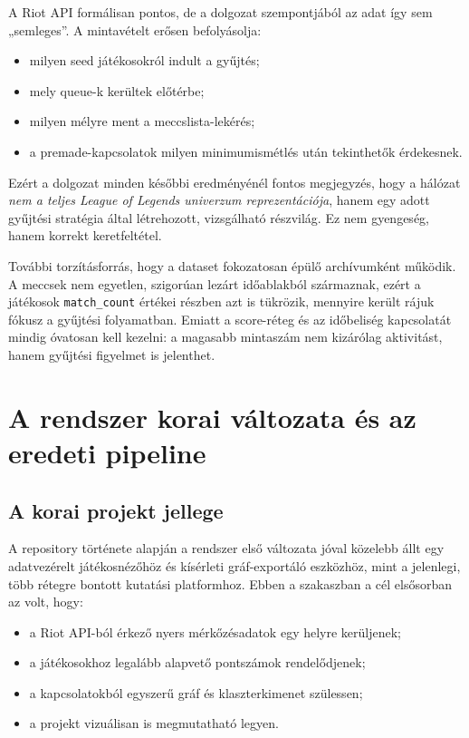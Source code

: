 ﻿\documentclass[a4paper,12pt]{report}
\begin{document}
A Riot API formálisan pontos, de a dolgozat szempontjából az adat így sem „semleges”. A mintavételt erősen befolyásolja:

\begin{itemize}
    \item milyen seed játékosokról indult a gyűjtés;
    \item mely queue-k kerültek előtérbe;
    \item milyen mélyre ment a meccslista-lekérés;
    \item a premade-kapcsolatok milyen minimumismétlés után tekinthetők érdekesnek.
\end{itemize}

Ezért a dolgozat minden későbbi eredményénél fontos megjegyzés, hogy a hálózat \emph{nem a teljes League of Legends univerzum reprezentációja}, hanem egy adott gyűjtési stratégia által létrehozott, vizsgálható részvilág. Ez nem gyengeség, hanem korrekt keretfeltétel.

További torzításforrás, hogy a dataset fokozatosan épülő archívumként működik. A meccsek nem egyetlen, szigorúan lezárt időablakból származnak, ezért a játékosok \texttt{match\_count} értékei részben azt is tükrözik, mennyire került rájuk fókusz a gyűjtési folyamatban. Emiatt a score-réteg és az időbeliség kapcsolatát mindig óvatosan kell kezelni: a magasabb mintaszám nem kizárólag aktivitást, hanem gyűjtési figyelmet is jelenthet.

\chapter{A rendszer korai változata és az eredeti pipeline}

\section{A korai projekt jellege}

A repository története alapján a rendszer első változata jóval közelebb állt egy adatvezérelt játékosnézőhöz és kísérleti gráf-exportáló eszközhöz, mint a jelenlegi, több rétegre bontott kutatási platformhoz. Ebben a szakaszban a cél elsősorban az volt, hogy:

\begin{itemize}
    \item a Riot API-ból érkező nyers mérkőzésadatok egy helyre kerüljenek;
    \item a játékosokhoz legalább alapvető pontszámok rendelődjenek;
    \item a kapcsolatokból egyszerű gráf és klaszterkimenet szülessen;
    \item a projekt vizuálisan is megmutatható legyen.
\end{itemize}
\end{document}
